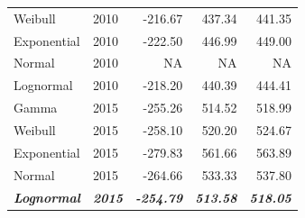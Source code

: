\documentclass[
11pt, %
oneside, %
english, %
singlespacing, %
]{macthesis} %
\begin{document}
\begin{table}
\begin{tabular}[t]{llrrr}
\hspace{1em}Weibull & 2010 & -216.67 & 437.34 & 441.35\\
\hspace{1em}Exponential & 2010 & -222.50 & 446.99 & 449.00\\
\hspace{1em}Normal & 2010 & NA & NA & NA\\
\hspace{1em}Lognormal & 2010 & -218.20 & 440.39 & 444.41\\
\hspace{1em}Gamma & 2015 & -255.26 & 514.52 & 518.99\\
\hspace{1em}Weibull & 2015 & -258.10 & 520.20 & 524.67\\
\hspace{1em}Exponential & 2015 & -279.83 & 561.66 & 563.89\\
\hspace{1em}Normal & 2015 & -264.66 & 533.33 & 537.80\\
\begingroup\fontsize{10}{12}\selectfont \em{\textbf{\hspace{1em}Lognormal}}\endgroup & \begingroup\fontsize{10}{12}\selectfont \em{\textbf{2015}}\endgroup & \begingroup\fontsize{10}{12}\selectfont \em{\textbf{-254.79}}\endgroup & \begingroup\fontsize{10}{12}\selectfont \em{\textbf{513.58}}\endgroup & \begingroup\fontsize{10}{12}\selectfont \em{\textbf{518.05}}\endgroup\\
\bottomrule
\end{tabular}
\end{table}
\end{document}
